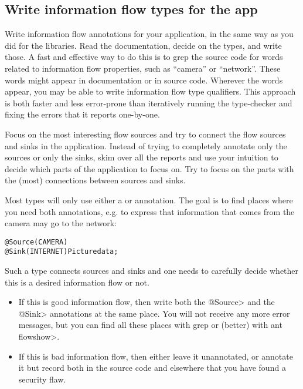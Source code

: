 \subsection{Write information flow types for the app\label{flow-task-annotate-app}}

Write information flow annotations for your application, in the same way as
you did for the libraries.  Read the documentation, decide on the types,
and write those.  A fast and effective way to do this is to grep the source
code for words related to information flow properties, such as ``camera''
or ``network''.  These words might appear in documentation or in source
code.  Wherever the words appear, you may be able to write information flow
type qualifiers.  This approach is both faster and less error-prone than
iteratively running the type-checker and fixing the errors that it reports
one-by-one.



Focus on the most interesting flow sources and try to connect the flow
sources and sinks in the application. Instead of trying to completely
annotate only the sources or only the sinks, skim over all the reports
and use your intuition to decide which parts of the application to
focus on. Try to focus on the parts with the (most) connections
between sources and sinks.

Most types will only use either a \srcsome or \sinksome
annotation.
The goal is to find places where you need both annotations, e.g. to
express that information that comes from the camera may go to the
network:

\begin{alltt}
    @Source(CAMERA)
    @Sink(INTERNET) Picture data;
\end{alltt}

Such a type connects sources and sinks and one needs to carefully
decide whether this is a desired information flow or not.
\begin{itemize}
\item If this is good information flow, then write both the \<@Source>
  and the \<@Sink> annotations at the same place. You will not
  receive any more error messages, but you can find all these places
  with grep or (better) with \<ant flowshow>.
\item If this is bad information flow, then either leave it unannotated,
  or annotate it but record both in the source code and elsewhere that
  you have found a security flaw.
\end{itemize}


